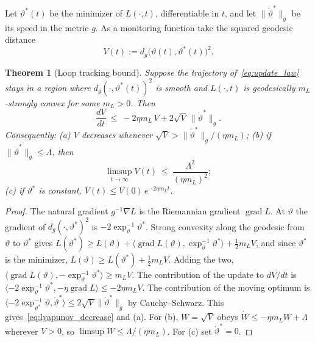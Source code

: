 \documentclass[12pt]{article}
\newtheorem{theorem}{Theorem}
\theoremstyle{definition}
\begin{document}
Let $\vartheta^*(t)$ be the minimizer of $L(\cdot,t)$, differentiable in $t$, and let $\|\dot\vartheta^*\|_g$ be its speed in the metric $g$. As a monitoring function take the squared geodesic distance
\begin{equation}
\label{eq:lyapunov}
V(t):=d_g\bigl(\vartheta(t),\vartheta^*(t)\bigr)^2 .
\end{equation}

\begin{theorem}[Loop tracking bound]
\label{thm:loop_stability}
Suppose the trajectory of~\eqref{eq:update_law} stays in a region where $d_g(\cdot,\vartheta^*(t))^2$ is smooth and $L(\cdot,t)$ is geodesically $m_L$-strongly convex for some $m_L>0$. Then
\begin{equation}
\label{eq:lyapunov_decrease}
\frac{dV}{dt}\ \le\ -2\eta m_L\,V+2\sqrt V\,\|\dot\vartheta^*\|_g .
\end{equation}
Consequently: (a) $V$ decreases whenever $\sqrt V>\|\dot\vartheta^*\|_g/(\eta m_L)$; (b) if $\|\dot\vartheta^*\|_g\le\Lambda$, then
\begin{equation}
\label{eq:tracking_neighbourhood}
\limsup_{t\to\infty}V(t)\ \le\ \frac{\Lambda^2}{(\eta m_L)^2};
\end{equation}
(c) if $\vartheta^*$ is constant, $V(t)\le V(0)\,e^{-2\eta m_Lt}$.
\end{theorem}

\begin{proof}
The natural gradient $g^{-1}\nabla L$ is the Riemannian gradient $\operatorname{grad}L$. At $\vartheta$ the gradient of $d_g(\cdot,\vartheta^*)^2$ is $-2\exp_\vartheta^{-1}\vartheta^*$. Strong convexity along the geodesic from $\vartheta$ to $\vartheta^*$ gives $L(\vartheta^*)\ge L(\vartheta)+\langle\operatorname{grad}L(\vartheta),\exp_\vartheta^{-1}\vartheta^*\rangle+\tfrac12m_LV$, and since $\vartheta^*$ is the minimizer, $L(\vartheta)\ge L(\vartheta^*)+\tfrac12m_LV$. Adding the two, $\langle\operatorname{grad}L(\vartheta),-\exp_\vartheta^{-1}\vartheta^*\rangle\ge m_LV$. The contribution of the update to $dV/dt$ is $\langle-2\exp_\vartheta^{-1}\vartheta^*,-\eta\operatorname{grad}L\rangle\le-2\eta m_LV$. The contribution of the moving optimum is $\langle-2\exp_{\vartheta^*}^{-1}\vartheta,\dot\vartheta^*\rangle\le2\sqrt V\|\dot\vartheta^*\|_g$ by Cauchy--Schwarz. This gives~\eqref{eq:lyapunov_decrease} and (a). For (b), $W=\sqrt V$ obeys $\dot W\le-\eta m_LW+\Lambda$ wherever $V>0$, so $\limsup W\le\Lambda/(\eta m_L)$. For (c) set $\dot\vartheta^*=0$.
\end{proof}
\end{document}
